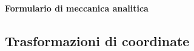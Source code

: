 \documentclass[11pt,landscape,a4paper]{article}
\begin{document}
\raggedright
\footnotesize

\begin{center}
     \Large{\textbf{Formulario di meccanica analitica}} \\
\end{center}
\begin{multicols}{3}
\setlength{\premulticols}{1pt}
\setlength{\postmulticols}{1pt}
\setlength{\multicolsep}{1pt}
\setlength{\columnsep}{2pt}

\renewcommand{\vec}[1]{\underline{#1}}
\newcommand{\e}[0]{\hat{e}}
\newcommand{\de}[2]{\frac{\partial #1}{\partial #2}}
\newcommand{\ddt}[1]{\frac{\dif #1}{\dif t}}
\newcommand{\I}[0]{\mathcal{I}}
\newcommand{\Lag}[0]{\mathscr{L}}
\newcommand{\Ham}[0]{\mathscr{H}}
\newcommand{\dipdue}[0]{(t, q^k)}
\newcommand{\diptre}[0]{(t, q^k, \dot q ^k)}

\section{Trasformazioni di coordinate}

\end{multicols}
\end{document}
